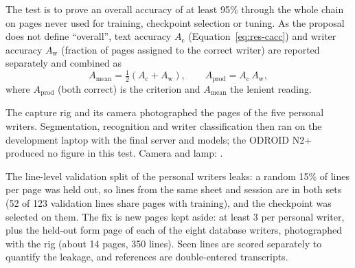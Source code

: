 
\medskip
\label{sec:res-qtp2}


            The test is to prove an overall accuracy of at least 95\% through the whole chain on pages never used for training, checkpoint selection or tuning.
            As the proposal does not define ``overall'', text accuracy $A_{\mathrm{c}}$ (Equation~\ref{eq:res-cacc}) and writer accuracy $A_{\mathrm{w}}$ (fraction of pages assigned to the correct writer) are reported separately and combined as
            \begin{equation}
            \label{eq:res-overall}
            A_{\mathrm{mean}}=\tfrac{1}{2}\left(A_{\mathrm{c}}+A_{\mathrm{w}}\right),\qquad A_{\mathrm{prod}}=A_{\mathrm{c}}\,A_{\mathrm{w}},
            \end{equation}
            where $A_{\mathrm{prod}}$ (both correct) is the criterion and $A_{\mathrm{mean}}$ the lenient reading.


            The capture rig and its camera photographed the pages of the five personal writers. Segmentation, recognition and writer classification then ran on the development laptop with the final server and models; the ODROID N2+ produced no figure in this test. Camera and lamp: .


            The line-level validation split of the personal writers leaks: a random 15\% of lines per page was held out, so lines from the same sheet and session are in both sets (52 of 123 validation lines share pages with training), and the checkpoint was selected on them.
            The fix is new pages kept aside: at least 3 per personal writer, plus the held-out form page of each of the eight database writers, photographed with the rig (about 14 pages, 350 lines). Seen lines are scored separately to quantify the leakage, and references are double-entered transcripts.


